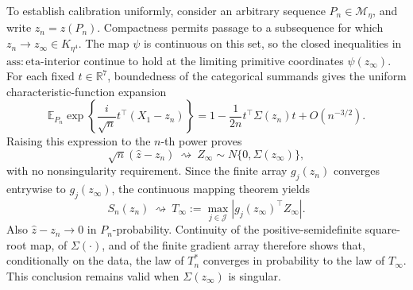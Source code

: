 To establish calibration uniformly, consider an arbitrary sequence \(P_n\in\mathcal M_\eta\), and write \(z_n=z(P_n)\).  Compactness permits passage to a subsequence for which \(z_n\to z_\infty\in K_{\eta^4}\).  The map \(\psi\) is continuous on this set, so the closed inequalities in \(\mathrm{ass{:}eta\text{-}interior}\) continue to hold at the limiting primitive coordinates \(\psi(z_\infty)\).  For each fixed \(t\in\mathbb R^7\), boundedness of the categorical summands gives the uniform characteristic-function expansion
\[
 \mathbb E_{P_n}\exp\!\left\{
 \frac{i}{\sqrt n}t^\top(X_1-z_n)
 \right\}
 =1-\frac1{2n}t^\top\Sigma(z_n)t+O(n^{-3/2}).
\]
Raising this expression to the \(n\)-th power proves
\[
 \sqrt n(\widehat z-z_n)\ \rightsquigarrow\
 Z_\infty\sim N\{0,\Sigma(z_\infty)\},
\]
with no nonsingularity requirement.  Since the finite array \(g_j(z_n)\) converges entrywise to \(g_j(z_\infty)\), the continuous mapping theorem yields
\[
 S_n(z_n)\ \rightsquigarrow\
 T_\infty:=\max_{j\in\mathcal J}
 \left|g_j(z_\infty)^\top Z_\infty\right|.
\]
Also \(\widehat z-z_n\to0\) in \(P_n\)-probability.  Continuity of the positive-semidefinite square-root map, of \(\Sigma(\cdot)\), and of the finite gradient array therefore shows that, conditionally on the data, the law of \(T_n^*\) converges in probability to the law of \(T_\infty\).  This conclusion remains valid when \(\Sigma(z_\infty)\) is singular.


